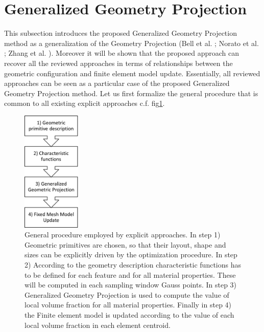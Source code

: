 \section{Generalized Geometry Projection}
\label{GGP}
This subsection introduces the proposed Generalized Geometry Projection method as a generalization of the Geometry Projection (Bell et al. \cite{bell2012geometry}; Norato et al. \cite{norato2015geometry}; Zhang et al. \cite{zhang2016geometry}). Moreover it will be shown that the proposed approach can recover all the reviewed approaches in terms of relationships between the geometric configuration and finite element model update. Essentially, all reviewed approaches can be seen as a particular case of the proposed Generalized Geometry Projection method. 
Let us first formalize the general procedure that is common to all existing explicit approaches c.f. fig\ref{fig:1}.
\begin{figure}[ht]
\centering
  \includegraphics[width=0.25\textwidth]{images/Ch3/geometry_projection_scheme.png}
\caption{General procedure employed by explicit approaches. In step 1) Geometric primitives are chosen, so that their layout, shape and sizes can be explicitly driven by the optimization procedure. In step 2) According to the geometry description characteristic functions has to be defined for each feature and for all material properties. These will be computed in each sampling window Gauss points. In step 3) Generalized Geometry Projection is used to compute the value of local volume fraction for all material properties. Finally in step 4) the Finite element model is updated according to the value of each local volume fraction in each element centroid. }
\label{fig:1}       %
\end{figure}
